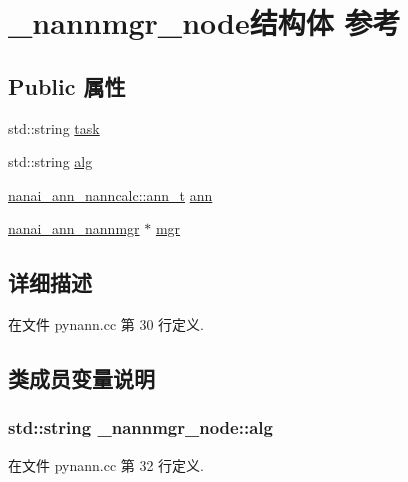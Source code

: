 \hypertarget{struct__nannmgr__node}{}\section{\+\_\+nannmgr\+\_\+node结构体 参考}
\label{struct__nannmgr__node}
\subsection*{Public 属性}
\begin{DoxyCompactItemize}
\item 
std\+::string \hyperlink{struct__nannmgr__node_af36c967eb949e00426e4b5ebfed4553d}{task}
\item 
std\+::string \hyperlink{struct__nannmgr__node_a0c18527e5a7545153dec9cde85032b1f}{alg}
\item 
\hyperlink{classnanai_1_1nanai__ann__nanncalc_1_1ann__t}{nanai\+\_\+ann\+\_\+nanncalc\+::ann\+\_\+t} \hyperlink{struct__nannmgr__node_a610ea5ea6fe3cff8a7554ccff7a10f5d}{ann}
\item 
\hyperlink{classnanai_1_1nanai__ann__nannmgr}{nanai\+\_\+ann\+\_\+nannmgr} $\ast$ \hyperlink{struct__nannmgr__node_a26300b0fc49531f10ecf0adbc4395095}{mgr}
\end{DoxyCompactItemize}


\subsection{详细描述}


在文件 pynann.\+cc 第 30 行定义.



\subsection{类成员变量说明}
\hypertarget{struct__nannmgr__node_a0c18527e5a7545153dec9cde85032b1f}{}
\subsubsection[{alg}]{\setlength{\rightskip}{0pt plus 5cm}std\+::string \+\_\+nannmgr\+\_\+node\+::alg}\label{struct__nannmgr__node_a0c18527e5a7545153dec9cde85032b1f}


在文件 pynann.\+cc 第 32 行定义.

\hypertarget{struct__nannmgr__node_a610ea5ea6fe3cff8a7554ccff7a10f5d}{}
